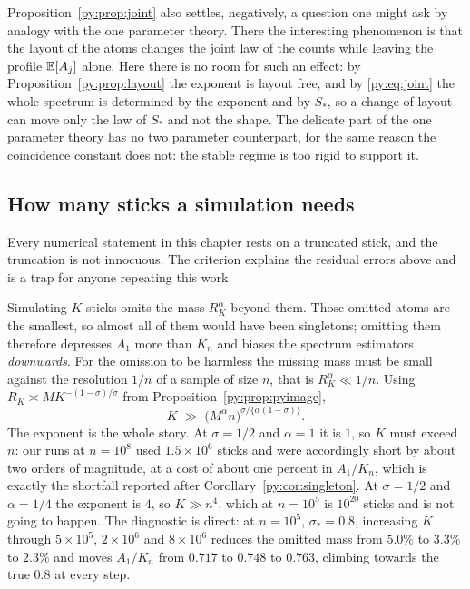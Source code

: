 \begin{remark}
Proposition~\ref{py:prop:joint} also settles, negatively, a question one might ask by analogy with the
one parameter theory. There the interesting phenomenon is that the layout of the atoms changes the
joint law of the counts while leaving the profile $\mathbb{E}[A_j]$ alone. Here there is no room for such
an effect: by Proposition~\ref{py:prop:layout} the exponent is layout free, and by
\eqref{py:eq:joint} the whole spectrum is determined by the exponent and by $S_*$, so a change of
layout can move only the law of $S_*$ and not the shape. The delicate part of the one parameter
theory has no two parameter counterpart, for the same reason the coincidence constant does not: the
stable regime is too rigid to support it.
\end{remark}

\subsection{How many sticks a simulation needs}
\label{py:sec:truncation}

Every numerical statement in this chapter rests on a truncated stick, and the truncation is not
innocuous. The criterion explains the residual errors above and is a trap for anyone repeating this
work.

Simulating $K$ sticks omits the mass $R_K^{\alpha}$ beyond them. Those omitted atoms are the
smallest, so almost all of them would have been singletons; omitting them therefore depresses $A_1$
more than $K_n$ and biases the spectrum estimators \emph{downwards}. For the omission to be
harmless the missing mass must be small against the resolution $1/n$ of a sample of size $n$, that
is $R_K^{\alpha} \ll 1/n$. Using $R_K \asymp MK^{-(1-\sigma)/\sigma}$ from
Proposition~\ref{py:prop:pyimage},
\begin{equation}
K \;\gg\; \big(M^{\alpha}n\big)^{\sigma/\{\alpha(1-\sigma)\}} .
\label{py:eq:trunc}
\end{equation}
The exponent is the whole story. At $\sigma = 1/2$ and $\alpha = 1$ it is $1$, so $K$ must exceed
$n$: our runs at $n = 10^{8}$ used $1.5\times10^{6}$ sticks and were accordingly short by about two orders of magnitude, at a cost of about one percent in $A_1/K_n$,
which is exactly the shortfall reported after Corollary~\ref{py:cor:singleton}. At $\sigma = 1/2$ and
$\alpha = 1/4$ the exponent is $4$, so $K \gg n^{4}$, which at $n = 10^{5}$ is $10^{20}$ sticks and
is not going to happen. The diagnostic is direct: at $n = 10^{5}$, $\sigma_* = 0.8$, increasing $K$
through $5\times10^{5}$, $2\times10^{6}$ and $8\times10^{6}$ reduces the omitted mass from $5.0\%$
to $3.3\%$ to $2.3\%$ and moves $A_1/K_n$ from $0.717$ to $0.748$ to $0.763$, climbing towards the
true $0.8$ at every step.

